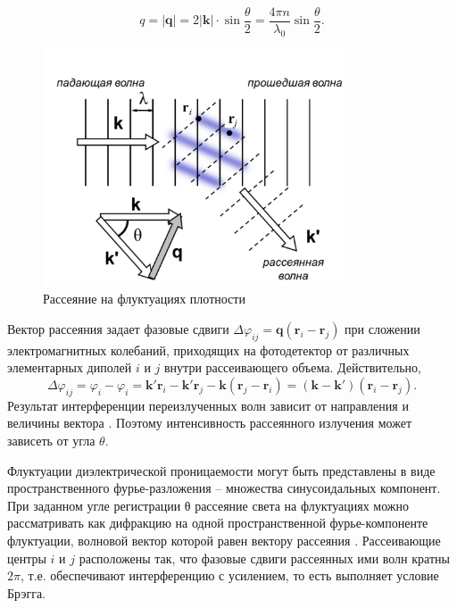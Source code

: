 \documentclass[a4paper,12pt]{article} %
\begin{document}
\begin{equation}
q=|\boldsymbol{q}|=2|\boldsymbol{k}| \cdot \sin \frac{\theta}{2}=\frac{4 \pi n}{\lambda_{0}} \sin \frac{\theta}{2}.
\end{equation}

\begin{figure}[h!]
\includegraphics[width=0.8\textwidth]{shema.png}
\caption{Рассеяние на флуктуациях плотности}
\end{figure}

Вектор рассеяния  задает фазовые сдвиги $\Delta \varphi_{i j}=\boldsymbol{q}\left(\boldsymbol{r}_{i}-\boldsymbol{r}_{j}\right)$ при сложении электромагнитных колебаний, приходящих на фотодетектор от различных элементарных диполей $i$ и $j$ внутри рассеивающего объема. Действительно,
$$
\Delta \varphi_{i j}=\varphi_{i} - \varphi_{i} = \boldsymbol{k'}\boldsymbol{r}_i - \boldsymbol{k'}\boldsymbol{r}_j - \boldsymbol{k}(\boldsymbol{r}_j-\boldsymbol{r}_i) = (\boldsymbol{k} - \boldsymbol{k'})(\boldsymbol{r}_i - \boldsymbol{r}_j).
$$
Результат интерференции переизлученных волн зависит от направления и величины вектора . Поэтому интенсивность рассеянного излучения может зависеть от угла $\theta$. 

Флуктуации диэлектрической проницаемости могут быть представлены в виде пространственного фурье-разложения – множества синусоидальных компонент. При заданном угле регистрации θ рассеяние света на флуктуациях можно рассматривать как дифракцию на одной пространственной фурье-компоненте флуктуации, волновой вектор которой равен вектору рассеяния . Рассеивающие центры $i$ и $j$ расположены так, что фазовые сдвиги рассеянных ими волн  кратны $2\pi$, т.е. обеспечивают интерференцию с усилением, то есть выполняет условие Брэгга. 
\end{document}
